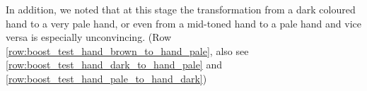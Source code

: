 In addition, we noted that at this stage the transformation from a dark coloured hand to a very pale hand, or even from a mid-toned hand to a pale hand and vice versa is especially unconvincing. (Row \ref{row:boost_test_hand_brown_to_hand_pale}, also see \ref{row:boost_test_hand_dark_to_hand_pale} and \ref{row:boost_test_hand_pale_to_hand_dark})

